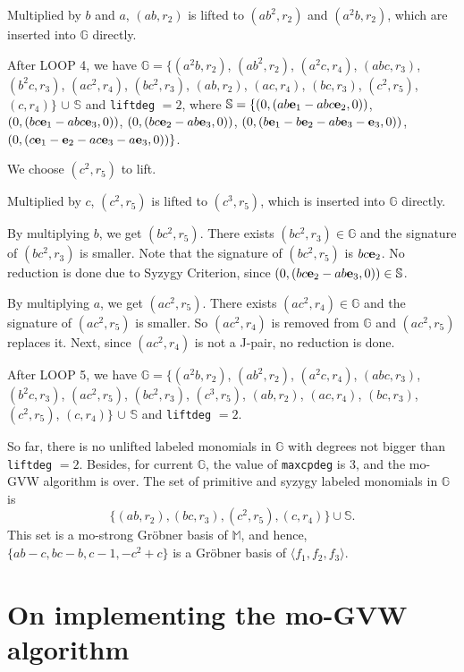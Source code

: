\documentclass[final, number, 3p,12pt]{elsarticle}
\def\G{{\mathbb{G}}}
\def\S{{\mathbb{S}}}
\def\M{{\mathbb M}}
\def\e{{\bf e}}
\begin{document}
Multiplied by $b$ and $a$, $(ab, r_2)$ is lifted to $(ab^2, r_2)$ and $(a^2b, r_2)$, which are inserted into $\G$ directly. 

After LOOP 4, we have $\G = \{(a^2b, r_2)$, $(ab^2, r_2)$, $(a^2c, r_4)$, $(abc, r_3)$, $(b^2c, r_3)$, $(ac^2, r_4)$, $(bc^2, r_3)$, $(ab, r_2)$, $(ac, r_4)$, $(bc, r_3)$, $(c^2, r_5)$, $(c, r_4)\}$ $\cup$ $\S$ and {\tt liftdeg} $=2$, where $\S = \{(0, (ab\e_1 - abc\e_2, 0))$, $(0, (bc\e_1 - abc\e_3, 0))$, $(0, (bc\e_2 - ab\e_3, 0))$, $(0, (b\e_1 - b\e_2 -ab\e_3 - \e_3, 0))$, $(0, (c\e_1 - \e_2 - ac\e_3 - a\e_3, 0))\}$. 




 We choose $(c^2, r_5)$ to lift. 

Multiplied by $c$, $(c^2, r_5)$ is lifted to $(c^3, r_5)$, which is inserted into $\G$ directly. 

By multiplying $b$, we get $(bc^2, r_5)$. There exists $(bc^2, r_3) \in \G$ and the signature of $(bc^2, r_3)$ is smaller. Note that the signature of $(bc^2, r_5)$ is $bc\e_2$. No reduction is done due to Syzygy Criterion, since $(0, (bc\e_2 - ab\e_3, 0))\in \S$.

By multiplying $a$, we get $(ac^2, r_5)$. There exists $(ac^2, r_4) \in \G$ and the signature of $(ac^2, r_5)$ is smaller. So $(ac^2, r_4)$ is removed from $\G$ and $(ac^2, r_5)$ replaces it. Next, since $(ac^2, r_4)$ is not a J-pair, no reduction is done.

After LOOP 5, we have $\G = \{(a^2b, r_2)$, $(ab^2, r_2)$, $(a^2c, r_4)$, $(abc, r_3)$, $(b^2c, r_3)$, $(ac^2, r_5)$, $(bc^2, r_3)$, $(c^3, r_5)$, $(ab, r_2)$, $(ac, r_4)$, $(bc, r_3)$, $(c^2, r_5)$, $(c, r_4)\}$ $\cup$ $\S$ and {\tt liftdeg} $=2$. 


So far, there is no unlifted labeled monomials in $\G$ with degrees not bigger than {\tt liftdeg} $=2$. Besides, for current $\G$, the value of {\tt maxcpdeg} is 3, and the mo-GVW algorithm is over. The set of primitive and syzygy labeled monomials in $\G$ is 
$$\{(ab, r_2), (bc, r_3), (c^2, r_5), (c, r_4)\} \cup \S.$$ This set is a mo-strong Gr\"obner basis of $\M$, and hence, $\{ab-c, bc-b, c-1, -c^2+c\}$ is a Gr\"obner basis of $\langle f_1, f_2, f_3\rangle$.









\section{On implementing the mo-GVW algorithm} \label{sec_implementation}
\end{document}
